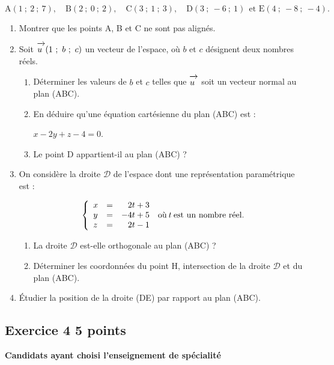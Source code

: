 \documentclass[10pt]{article}
\newcommand{\vect}[1]{\mathchoice%
{\overrightarrow{\displaystyle\mathstrut#1\,\,}}%
{\overrightarrow{\textstyle\mathstrut#1\,\,}}%
{\overrightarrow{\scriptstyle\mathstrut#1\,\,}}%
{\overrightarrow{\scriptscriptstyle\mathstrut#1\,\,}}}
\begin{document}
\[\text{A}(1~;~2~;~7),\quad \text{B}(2~;~0~;~2),\quad \text{C}(3~;~1~;~3),\quad \text{D}(3~;~ -6~;~1) \:\:\text{et E}(4~;~-8~;~-4).\]
 
\begin{enumerate}
\item Montrer que les points A, B et C ne sont pas alignés. 
\item Soit $\vect{u}(1~;~b~;~c)$ un vecteur de l'espace, où $b$ et $c$ désignent deux nombres réels. 
	\begin{enumerate}
		\item Déterminer les valeurs de $b$ et $c$ telles que $\vect{u}$ soit un vecteur normal au plan (ABC). 
		\item En déduire qu'une équation cartésienne du plan (ABC) est : 

		$x - 2 y + z - 4 = 0$. 
		\item Le point D appartient-il au plan (ABC) ?
	\end{enumerate} 
\item On considère la droite $\mathcal{D}$ de l'espace dont une représentation paramétrique est :
 
\[\left\{\begin{array}{l c l}
x& =& \phantom{-}2t+3\\ 
y& =& - 4t + 5\\  
z& =&\phantom{-}2t-1
\end{array}\right. \: \text{où}\: t\: \text{est un nombre réel.}\]

	\begin{enumerate}
		\item La droite $\mathcal{D}$ est-elle orthogonale au plan (ABC) ? 
		\item Déterminer les coordonnées du point H, intersection de la droite $\mathcal{D}$ et du plan (ABC).
	\end{enumerate} 
\item Étudier la position de la droite (DE) par rapport au plan (ABC). 
\end{enumerate}

\subsection*{Exercice 4 \hfill 5 points}

\textbf{Candidats ayant choisi l'enseignement de spécialité}

\medskip
\end{document}
